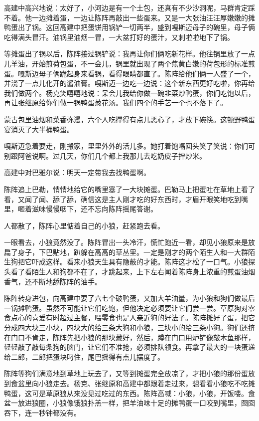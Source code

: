 \par 高建中高兴地说：太好了，小河边是有一个土包，还真有不少沙洞呢，马群肯定踩不着。他一边摊着蛋，一边让陈阵再敲出一些蛋来。又是一大张油汪汪厚嫩嫩的摊鸭蛋出了锅。这回高建中把蛋饼用锅铲一切两半，盛到嘎斯迈母子的碗里，母子俩吃得满头冒汗。油锅里油烟一冒，一大盆打好的蛋汁，又刺啦啦地下了锅。
\par 等摊蛋出了锅以后，陈阵接过锅铲说：我再让你们俩吃新花样。他往锅里放了一点儿羊油，开始煎荷包蛋，不一会儿，锅里就出现了两个焦黄白嫩的荷包形的标准煎蛋。嘎斯迈母子俩跪起身来看锅，看得眼睛都直了。陈阵给他们俩一人盛了一个，并浇了一点儿化开的酱油膏。嘎斯迈一边吃一边说：这个新东西更好吃啦，你再给我们做两个。杨克笑嘻嘻地说：呆会儿我给你做一碗韭菜炒鸭蛋，你们吃饱以后，再让张继原给你们做一锅鸭蛋葱花汤。我们四个的手艺一个也不落下了。
\par 蒙古包里油烟和菜香弥漫，六个人吃撑得有点儿恶心了，才放下碗筷。这顿野鸭蛋宴消灭了大半桶鸭蛋。
\par 嘎斯迈急着要走，刚搬家，里里外外的活儿多。她打着饱嗝回头笑了笑说：你们可别跟阿爸说啊。过几天，你们几个都上我那儿去吃奶皮子拌炒米。
\par 高建中对巴雅尔说：明天一定带我去找鸭蛋啊。
\par 陈阵追上巴勒，悄悄地给它的嘴里塞了一大块摊蛋。巴勒马上把蛋吐在草地上看了看，又闻了闻、舔了舔，确信这是主人刚才吃的好东西时，才眉开眼笑地吃到嘴里，咂着滋味慢慢咽下，还不忘向陈阵摇尾答谢。
\par 人都散了，陈阵心里惦着自己的小狼，赶紧跑去看。
\par 一眼看去，小狼竟然没了。陈阵冒出一头冷汗，慌忙跑近一看，却见小狼原来是放扁了身子，下巴贴地，趴躲在高高的草丛里。一定是刚才的两个陌生人和一大群陌生狗把它吓成这样。看来小狼天生具有隐蔽的才能。陈阵这才松了一口气。小狼探头看了看陌生人和狗都不在了，才跳起来，上下左右闻着陈阵身上浓重的煎蛋油烟香气，还不断地舔陈阵的油手。
\par 陈阵转身进包，向高建中要了六七个破鸭蛋，又加大羊油量，为小狼和狗们做最后一锅摊鸭蛋。虽然不可能让它们吃饱，但他决定必须要让它们尝一尝。草原狗对零食点心的喜爱有时超过主餐，喂零食也是人亲近狗的好法子。陈阵摊好了蛋，把它分成四大块三小块，四块大的给三条大狗和小狼，三块小的给三条小狗。狗们还挤在门口不肯走，陈阵先把小狼的那块藏好，然后，蹲在门口用炉铲像敲木鱼那样，轻轻敲了敲每条狗的脑门，让它们不准抢，必须排队领食。再拿了最大的一块蛋递给二郎，二郎把蛋块叼住，尾巴摇得有点儿摆度了。
\par 陈阵等狗们满意地到草地上玩去了，又等到摊蛋完全放凉了，才把小狼的那份蛋放到食盆里向小狼走去。杨克、张继原和高建中都跟着走过来，想看看小狼吃不吃摊鸭蛋，这可是草原狼从来没见过吃过的东西。陈阵高喊：小狼，小狼，开饭喽。食盆一放进狼圈，小狼像饿狼扑羔一样，把羊油味十足的摊鸭蛋一口咬到嘴里，囫囵吞下，连一秒钟都没有。
